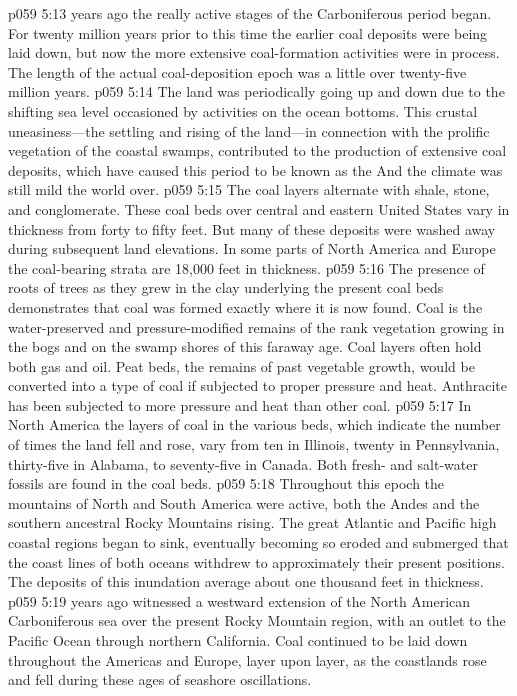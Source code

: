 \pc \vs p059 5:13  years ago the really active stages of the Carboniferous period began. For twenty million years prior to this time the earlier coal deposits were being laid down, but now the more extensive coal\hyp{}formation activities were in process. The length of the actual coal\hyp{}deposition epoch was a little over twenty\hyp{}five million years.
\vs p059 5:14 The land was periodically going up and down due to the shifting sea level occasioned by activities on the ocean bottoms. This crustal uneasiness---the settling and rising of the land---in connection with the prolific vegetation of the coastal swamps, contributed to the production of extensive coal deposits, which have caused this period to be known as the  And the climate was still mild the world over.
\vs p059 5:15 The coal layers alternate with shale, stone, and conglomerate. These coal beds over central and eastern United States vary in thickness from forty to fifty feet. But many of these deposits were washed away during subsequent land elevations. In some parts of North America and Europe the coal\hyp{}bearing strata are 18,000 feet in thickness.
\vs p059 5:16 The presence of roots of trees as they grew in the clay underlying the present coal beds demonstrates that coal was formed exactly where it is now found. Coal is the water\hyp{}preserved and pressure\hyp{}modified remains of the rank vegetation growing in the bogs and on the swamp shores of this faraway age. Coal layers often hold both gas and oil. Peat beds, the remains of past vegetable growth, would be converted into a type of coal if subjected to proper pressure and heat. Anthracite has been subjected to more pressure and heat than other coal.
\vs p059 5:17 In North America the layers of coal in the various beds, which indicate the number of times the land fell and rose, vary from ten in Illinois, twenty in Pennsylvania, thirty\hyp{}five in Alabama, to seventy\hyp{}five in Canada. Both fresh\hyp{} and salt\hyp{}water fossils are found in the coal beds.
\vs p059 5:18 Throughout this epoch the mountains of North and South America were active, both the Andes and the southern ancestral Rocky Mountains rising. The great Atlantic and Pacific high coastal regions began to sink, eventually becoming so eroded and submerged that the coast lines of both oceans withdrew to approximately their present positions. The deposits of this inundation average about one thousand feet in thickness.
\pc \vs p059 5:19  years ago witnessed a westward extension of the North American Carboniferous sea over the present Rocky Mountain region, with an outlet to the Pacific Ocean through northern California. Coal continued to be laid down throughout the Americas and Europe, layer upon layer, as the coastlands rose and fell during these ages of seashore oscillations.
